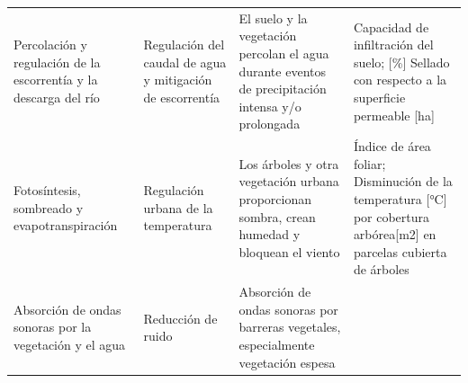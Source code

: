 \documentclass[12pt,a4paper,openany]{book}
\theoremstyle{definition}
\theoremstyle{definition}
\theoremstyle{definition}
\theoremstyle{remark}
\begin{document}
\begin{longtable}[]{@{}llll@{}}
\begin{minipage}[t]{0.26\columnwidth}\raggedright\strut
Percolación y regulación de la escorrentía y la descarga del río\strut
\end{minipage} & \begin{minipage}[t]{0.22\columnwidth}\raggedright\strut
Regulación del caudal de agua y mitigación de escorrentía\strut
\end{minipage} & \begin{minipage}[t]{0.19\columnwidth}\raggedright\strut
El suelo y la vegetación percolan el agua durante eventos de
precipitación intensa y/o prolongada\strut
\end{minipage} & \begin{minipage}[t]{0.22\columnwidth}\raggedright\strut
Capacidad de infiltración del suelo; {[}\%{]} Sellado con respecto a la
superficie permeable {[}ha{]}\strut
\end{minipage}\tabularnewline
\begin{minipage}[t]{0.26\columnwidth}\raggedright\strut
Fotosíntesis, sombreado y evapotranspiración\strut
\end{minipage} & \begin{minipage}[t]{0.22\columnwidth}\raggedright\strut
Regulación urbana de la temperatura\strut
\end{minipage} & \begin{minipage}[t]{0.19\columnwidth}\raggedright\strut
Los árboles y otra vegetación urbana proporcionan sombra, crean humedad
y bloquean el viento\strut
\end{minipage} & \begin{minipage}[t]{0.22\columnwidth}\raggedright\strut
Índice de área foliar; Disminución de la temperatura {[}°C{]} por
cobertura arbórea{[}m2{]} en parcelas cubierta de árboles\strut
\end{minipage}\tabularnewline
\begin{minipage}[t]{0.26\columnwidth}\raggedright\strut
Absorción de ondas sonoras por la vegetación y el agua\strut
\end{minipage} & \begin{minipage}[t]{0.22\columnwidth}\raggedright\strut
Reducción de ruido\strut
\end{minipage} & \begin{minipage}[t]{0.19\columnwidth}\raggedright\strut
Absorción de ondas sonoras por barreras vegetales, especialmente
vegetación espesa\strut
\end{minipage} & \begin{minipage}[t]{0.22\columnwidth}\raggedright\strut

\end{minipage}
\end{longtable}
\end{document}
